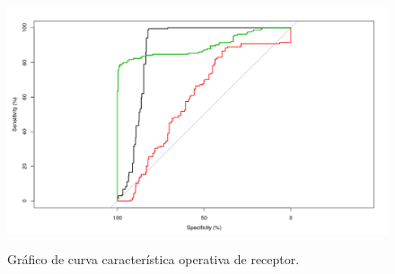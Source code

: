\begin{figure}[h!]
	\caption{Gráfico de curva característica operativa de receptor.}
	\centering
	\includegraphics[scale=0.5]{roc.png}
	\label{fig:roc}
\end{figure}